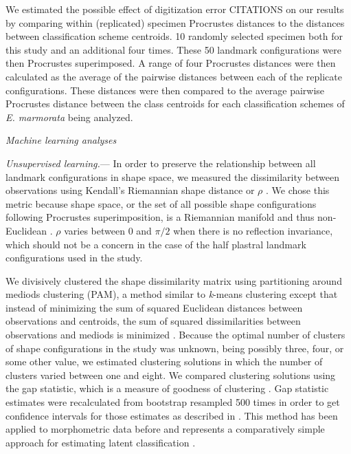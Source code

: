 \documentclass[12pt,letterpaper]{article}
\renewcommand{\subsection}[1]{%
\bigskip
\begin{center}
\begin{large}
\normalfont\itshape #1
\end{large}
\end{center}}
\renewcommand{\subsubsection}[1]{%
\vspace{2ex}
\noindent
\textit{#1.}---}
\begin{document}
We estimated the possible effect of digitization error CITATIONS on our results by comparing within (replicated) specimen Procrustes distances to the distances between classification scheme centroids. 10 randomly selected specimen both for this study and an additional four times. These 50 landmark configurations were then Procrustes superimposed. A range of four Procrustes distances were then calculated as the average of the pairwise distances between each of the replicate configurations. These distances were then compared to the average pairwise Procrustes distance between the class centroids for each classification schemes of \textit{E. marmorata} being analyzed.


\subsection{Machine learning analyses}
\subsubsection{Unsupervised learning}
In order to preserve the relationship between all landmark configurations in shape space, we measured the dissimilarity between observations using Kendall's Riemannian shape distance or \(\rho\) \citep{Kendall1984a,Dryden1998a}. We chose this metric because shape space, or the set of all possible shape configurations following Procrustes superimposition, is a Riemannian manifold and thus non-Euclidean \citep{Dryden1998a}. \(\rho\) varies between 0 and \(\pi / 2\) when there is no reflection invariance, which should not be a concern in the case of the half plastral landmark configurations used in the study.

We divisively clustered the shape dissimilarity matrix using partitioning around mediods clustering (PAM), a method similar to \textit{k}-means clustering except that instead of minimizing the sum of squared Euclidean distances between observations and centroids, the sum of squared dissimilarities between observations and mediods is minimized \citep{Kaufman1990}. Because the optimal number of clusters of shape configurations in the study was unknown, being possibly three, four, or some other value, we estimated clustering solutions in which the number of clusters varied between one and eight. We compared clustering solutions using the gap statistic, which is a measure of goodness of clustering \citep{Tibshirani2001a}. Gap statistic estimates were recalculated from bootstrap resampled 500 times in order to get confidence intervals for those estimates as described in \citet{Tibshirani2001a}. This method has been applied to morphometric data before and represents a comparatively simple approach for estimating latent classification \citep{Claude2008}.
\end{document}
